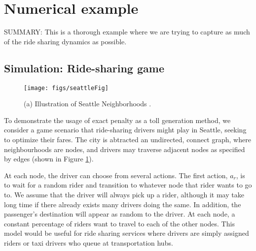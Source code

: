 \section{Numerical example}\label{numerical examples}
SUMMARY: This is a thorough example where we are trying to capture as much of the ride sharing dynamics as possible. 
\subsection{Simulation: Ride-sharing game}
\label{sec:rideshare}


\begin{figure}
\centering
\texttt{[image: figs/seattleFig]}
\caption{(a) Illustration of Seattle Neighborhoods .}
\label{fig:nbhds}
\end{figure}


To demonstrate the usage of exact penalty as a toll generation method, we consider a game scenario that ride-sharing drivers might play in Seattle, seeking to optimize their fares. The city is abtracted an undirected, connect graph, where neighbourhoods are nodes, and drivers may traverse adjacent nodes as specified by edges (shown in Figure \ref{fig:nbhds}). %

At each node, the driver can choose from several actions. The first action, $a_r$, is to wait for a random rider and transition to whatever node that rider wants to go to. We assume that the driver will always pick up a rider, although it may take long time if there already exists many drivers doing the same. In addition, the passenger's destination will appear as random to the driver.  At each node, a constant percentage of riders want to travel to each of the other nodes.  
This model would be useful for ride sharing services where drivers are simply assigned riders or taxi drivers who queue at transportation hubs.  

